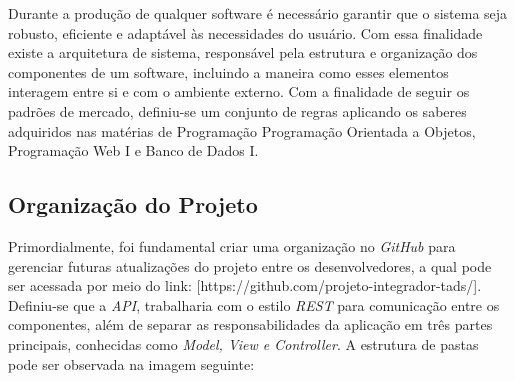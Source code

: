 Durante a produção de qualquer software é necessário garantir que o sistema seja robusto, eficiente e adaptável às necessidades do usuário. Com essa finalidade existe a arquitetura de sistema, responsável pela estrutura e organização dos componentes de um software, incluindo a maneira como esses elementos interagem entre si e com o ambiente externo. Com a finalidade de seguir os padrões de mercado, definiu-se um conjunto de regras aplicando os saberes adquiridos nas matérias de Programação Programação Orientada a Objetos, Programação Web I e Banco de Dados I.

\subsection{Organização do Projeto}

Primordialmente, foi fundamental criar uma organização no \textit{ GitHub} para gerenciar futuras atualizações do projeto entre os desenvolvedores, a qual pode ser acessada por meio do link: [https://github.com/projeto-integrador-tads/]. Definiu-se que a \textit{API}, trabalharia com o estilo \textit{REST} para comunicação entre os componentes, além de separar as responsabilidades da aplicação em três partes principais, conhecidas como \textit{Model, View e Controller}. A estrutura de pastas pode ser observada na imagem seguinte:


